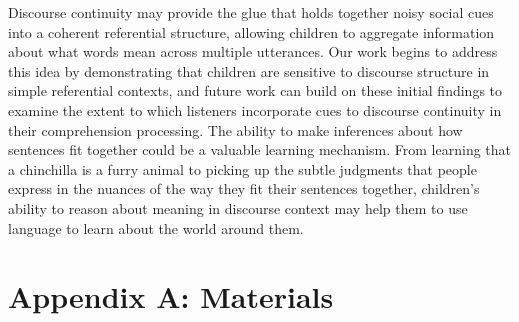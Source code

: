 \documentclass[man]{apa2}
\begin{document}
Discourse continuity may provide the glue that holds together noisy social cues into a coherent referential structure, allowing children to aggregate information about what words mean across multiple utterances.  Our work begins to address this idea by demonstrating that children are sensitive to discourse structure in simple referential contexts, and future work can build on these initial findings to examine the extent to which listeners incorporate cues to discourse continuity in their comprehension processing.  The ability to make inferences about how sentences fit together could be a valuable learning mechanism. From learning that a chinchilla is a furry animal to picking up the subtle judgments that people express in the nuances of the way they fit their sentences together, children's ability to reason about meaning in discourse context may help them to use language to learn about the world around them. 




\newpage
\theappendix 

\section{Appendix A: Materials}
\end{document}
